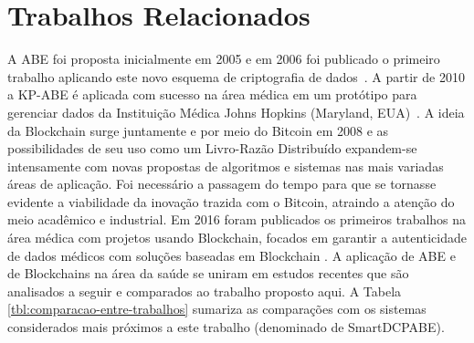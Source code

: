 \documentclass[a4paper,11pt]{article}
\begin{document}
\newpage
\section{Trabalhos Relacionados}





A ABE foi proposta inicialmente em 2005 \cite{Sahai2005} e em 2006 foi publicado o primeiro trabalho aplicando este novo esquema de criptografia de dados~\cite{Goyal2006}. A partir de 2010 a KP-ABE é aplicada com sucesso na área médica em um protótipo para gerenciar dados da Instituição Médica Johns Hopkins (Maryland, EUA)~\cite{Akinyele2010}.
A ideia da Blockchain surge juntamente e por meio do Bitcoin em 2008 \cite{nakamoto2008bitcoin} e as possibilidades de seu uso como um Livro-Razão Distribuído expandem-se intensamente com novas propostas de algoritmos e sistemas nas mais variadas áreas de aplicação.
Foi necessário a passagem do tempo para que se tornasse evidente a viabilidade da inovação trazida com o Bitcoin, atraindo a atenção do meio acadêmico e industrial. %
Em 2016 foram publicados os primeiros trabalhos na área médica com projetos usando Blockchain, focados em garantir a autenticidade de dados médicos com soluções baseadas em Blockchain \cite{Zhang2016,Azaria2016,Ekblaw2016}.
A aplicação de ABE e de Blockchains na área da saúde se uniram em estudos recentes que são analisados a seguir e comparados ao trabalho proposto aqui.
A Tabela \ref{tbl:comparacao-entre-trabalhos} sumariza as comparações com os sistemas considerados mais próximos a este trabalho (denominado de SmartDCPABE).
\end{document}
